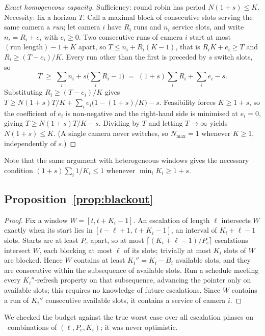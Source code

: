 \documentclass[preprint,review,12pt]{elsarticle}
\theoremstyle{definition}
\newcommand{\Nc}{N}
\newcommand{\Ki}{K_i}
\begin{document}
\begin{proof}[Exact homogeneous capacity]
Sufficiency: round robin has period $\Nc(1+s)\le K$. Necessity: fix a horizon $T$. Call a maximal
block of consecutive slots serving the same camera a \emph{run}; let camera $i$ have $R_i$ runs
and $n_i$ service slots, and write $n_i=R_i+e_i$ with $e_i\ge0$. Two consecutive runs of camera
$i$ start at most $(\text{run length}) - 1 + K$ apart, so $T\le n_i+R_i(K-1)$, that is
$R_iK+e_i\ge T$ and $R_i\ge(T-e_i)/K$. Every run other than the first is preceded by $s$ switch
slots, so
\[
T\;\ge\;\sum_i n_i+s\Big(\sum_i R_i-1\Big)\;=\;(1+s)\sum_i R_i+\sum_i e_i-s .
\]
Substituting $R_i\ge(T-e_i)/K$ gives
$T\ge \Nc(1+s)T/K+\sum_i e_i\big(1-(1+s)/K\big)-s$. Feasibility forces $K\ge 1+s$, so the
coefficient of $e_i$ is non-negative and the right-hand side is minimised at $e_i=0$, giving
$T\ge \Nc(1+s)T/K-s$. Dividing by $T$ and letting $T\to\infty$ yields $\Nc(1+s)\le K$. (A single
camera never switches, so $N_{\max}=1$ whenever $K\ge1$, independently of $s$.)
\end{proof}

\noindent
Note that the same argument with heterogeneous windows gives the necessary condition
$(1+s)\sum_i 1/\Ki\le1$ whenever $\min_i \Ki\ge 1+s$.

\subsection*{Proposition~\ref{prop:blackout}}
\begin{proof}
Fix a window $W=[t,t+\Ki-1]$. An escalation of length $\ell$ intersects $W$ exactly when its start
lies in $[t-\ell+1,\,t+\Ki-1]$, an interval of $\Ki+\ell-1$ slots. Starts are at least $P_e$ apart,
so at most $\lceil(\Ki+\ell-1)/P_e\rceil$ escalations intersect $W$, each blocking at most $\ell$
of its slots; trivially at most $\Ki$ slots of $W$ are blocked. Hence $W$ contains at least
$K_i''=\Ki-B_i$ available slots, and they are consecutive within the subsequence of available
slots. Run a schedule meeting every $K_i''$-refresh property on that subsequence, advancing the
pointer only on available slots; this requires no knowledge of future escalations. Since $W$
contains a run of $K_i''$ consecutive available slots, it contains a service of camera $i$.
\end{proof}

\noindent
We checked the budget against the true worst case over all escalation phases on
\numCfiveCells\ combinations of $(\ell,P_e,\Ki)$; it was never optimistic.
\end{document}
